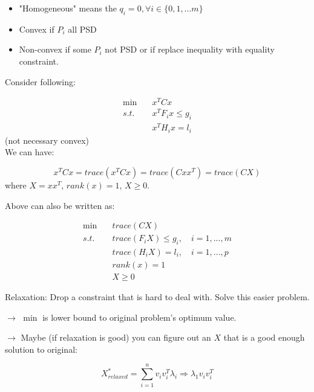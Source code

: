 \begin{itemize}
	\item "Homogeneous" means the $q_i = 0, \forall i\in \{0,1,...m \}$
	
	\item Convex if $P_i$ all PSD
	
	\item Non-convex if some $P_i$ not PSD or if replace inequality with equality constraint.
\end{itemize}

Consider following:

\begin{align*}
\min \quad&x^TCx \\
s.t. \quad&x^TF_ix \leq g_i\\
&x^TH_ix = l_i
\end{align*}
(not necessary convex)\\

We can have:

\begin{equation*}
x^TCx = trace(x^TCx) = trace(Cxx^T) = trace(CX)
\end{equation*}
where $X = xx^T$, $rank(x) = 1$, $X\geq0$. 

Above can also be written as:

\begin{align*}
\min \quad&trace(CX) \\
s.t. \quad&trace(F_iX) \leq g_i, \quad i = 1,...,m\\
&trace(H_iX) = l_i, \quad i = 1,...,p\\
&rank(x) = 1\\
&X\geq 0
\end{align*}

Relaxation: Drop a constraint that is hard to deal with. Solve this easier problem. 

$\rightarrow$ $\min$ is lower bound to original problem's optimum value. 

$\rightarrow$ Maybe (if relaxation is good) you can figure out an $X$ that is a good enough solution to original:

\begin{equation*}
X^*_{relaxed} =\sum^n_{i=1}v_iv^T_i\lambda_i \Rightarrow \lambda_1v_iv^T_i
\end{equation*}

